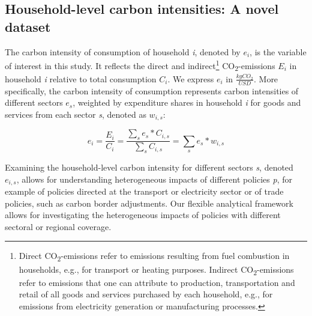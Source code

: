 \documentclass[12pt, a4paper]{article}
\begin{document}
\subsection{Household-level carbon intensities: A novel dataset} \label{sec:data}

The carbon intensity of consumption of household \textit{i}, denoted by $e_{i}$, is the variable of interest in this study. It reflects the direct and indirect\footnote{Direct CO\textsubscript{2}-emissions refer to emissions resulting from fuel combustion in households, e.g., for transport or heating purposes. Indirect CO\textsubscript{2}-emissions refer to emissions that one can attribute to production, transportation and retail of all goods and services purchased by each household, e.g., for emissions from electricity generation or manufacturing processes.} CO\textsubscript{2}-emissions $E_{i}$ in household \textit{i} relative to total consumption $C_{i}$. We express $e_{i}$ in $\frac{kgCO_{2}}{USD}$. More specifically, the carbon intensity of consumption represents carbon intensities of different sectors $e_{s}$, weighted by expenditure shares in household \textit{i} for goods and services from each sector \textit{s}, denoted as $w_{i,s}$:


\begin{equation} \label{eq:ei}
e_{i} = \frac{E_{i}}{C_{i}} = \frac{\sum_{s} e_{s}*C_{i,s}}{\sum_{s} C_{i,s}} = \sum_{s} e_{s}*w_{i,s}
\end{equation}


Examining the household-level carbon intensity for different sectors \textit{s}, denoted $e_{i,s}$, allows for understanding heterogeneous impacts of different policies \textit{p}, for example of policies directed at the transport or electricity sector or of trade policies, such as carbon border adjustments. Our flexible analytical framework allows for investigating the heterogeneous impacts of policies with different sectoral or regional coverage.

\end{document}
